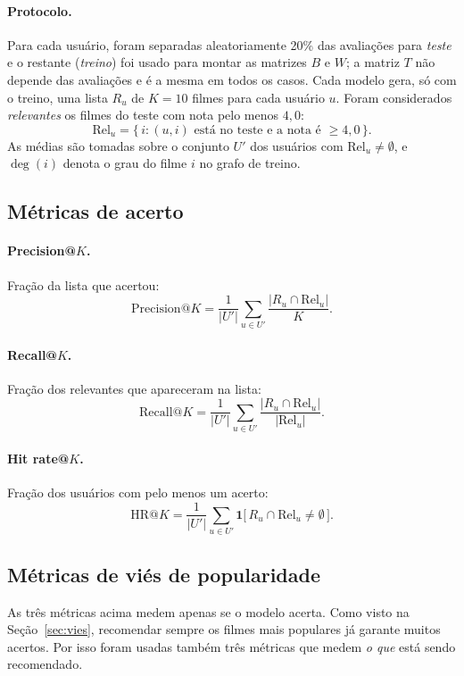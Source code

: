 \documentclass[12pt,a4paper]{article}
\theoremstyle{definition}
\begin{document}
\paragraph{Protocolo.}
Para cada usuário, foram separadas aleatoriamente 20\% das avaliações para
\emph{teste} e o restante (\emph{treino}) foi usado para montar as matrizes
$B$ e $W$; a matriz $T$ não depende das avaliações e é a mesma em todos
os casos. Cada modelo gera, só com o treino, uma lista $R_u$ de $K = 10$
filmes para cada usuário $u$. Foram considerados \emph{relevantes} os filmes do
teste com nota pelo menos $4{,}0$:
\[
  \mathrm{Rel}_u = \{\, i : (u, i) \text{ está no teste e a nota é } \geq 4{,}0 \,\}.
\]
As médias são tomadas sobre o conjunto $U'$ dos usuários com
$\mathrm{Rel}_u \neq \emptyset$, e $\deg(i)$ denota o grau do filme $i$ no
grafo de treino.

\subsection{Métricas de acerto}

\paragraph{Precision@$K$.} Fração da lista que acertou:
\[
  \mathrm{Precision@}K = \frac{1}{|U'|} \sum_{u \in U'}
  \frac{|R_u \cap \mathrm{Rel}_u|}{K}.
\]

\paragraph{Recall@$K$.} Fração dos relevantes que apareceram na lista:
\[
  \mathrm{Recall@}K = \frac{1}{|U'|} \sum_{u \in U'}
  \frac{|R_u \cap \mathrm{Rel}_u|}{|\mathrm{Rel}_u|}.
\]

\paragraph{Hit rate@$K$.} Fração dos usuários com pelo menos um acerto:
\[
  \mathrm{HR@}K = \frac{1}{|U'|} \sum_{u \in U'}
  \mathbf{1}\bigl[\, R_u \cap \mathrm{Rel}_u \neq \emptyset \,\bigr].
\]

\subsection{Métricas de viés de popularidade}

As três métricas acima medem apenas se o modelo acerta. Como visto na
Seção~\ref{sec:vies}, recomendar sempre os filmes mais
populares já garante muitos acertos. Por isso foram usadas também três métricas
que medem \emph{o que} está sendo recomendado.
\end{document}
